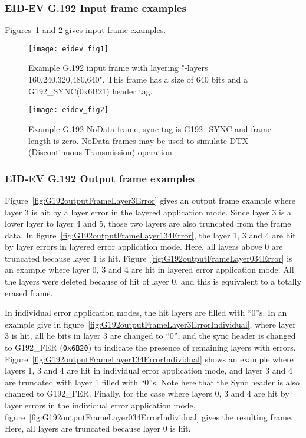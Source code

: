 \subsubsection{EID-EV G.192 Input frame examples }
Figures~\ref{fig:ExampleG192InputFrame} and
\ref{fig:ExampleG192NoDataFrame} gives input frame examples.

\begin{figure}[htp]
  \begin{center}
	\texttt{[image: eidev\_fig1]}
	\caption{Example G.192 input frame with layering  "-layers 160,240,320,480,640".
	This frame has a size of 640 bits and a G192\_SYNC(0x6B21) header tag.}
	\label{fig:ExampleG192InputFrame}
  \end{center}
\end{figure}

\begin{figure}[htp]
  \begin{center}
	\texttt{[image: eidev\_fig2]}
	\caption{Example G.192 NoData frame, sync tag is G192\_SYNC and frame length 
is zero. NoData frames may be used to simulate DTX (Discontinuous Transmission)
operation.}
	\label{fig:ExampleG192NoDataFrame}
  \end{center}
\end{figure}

\newpage
\subsubsection{EID-EV G.192 Output frame examples }
Figure~\ref{fig:G192outputFrameLayer3Error} gives an output frame
example where layer 3 is hit by a layer error in the layered
application mode. Since layer 3 is a lower layer to layer 4 and 5,
those two layers are also truncated from the frame data. In
figure~\ref{fig:G192outputFrameLayer134Error}, the layer 1, 3 and 4
are hit by layer errors in layered error application mode. Here, all
layers above 0 are truncated because layer 1 is
hit. Figure~\ref{fig:G192outputFrameLayer034Error} is an example where
layer 0, 3 and 4 are hit in layered error application mode. All the
layers were deleted because of hit of layer 0, and this is equivalent
to a totally erased frame.

In individual error application modes, the hit layers are filled with
``0''s. In an example give in
figure~\ref{fig:G192outputFrameLayer3ErrorIndividual}, where layer 3
is hit, all he bits in layer 3 are changed to ``0'', and the sync
header is changed to G192\_FER ({\tt 0x6B20}) to indicate the presence
of remaining layers with
errors. Figure~\ref{fig:G192outputFrameLayer134ErrorIndividual} shows
an example where layers 1, 3 and 4 are hit in individual error
application mode, and layer 3 and 4 are truncated with layer 1 filled
with ``0''s. Note here that the Sync header is also changed to
G192\_FER. Finally, for the case where layers 0, 3 and 4 are hit by
layer errors in the individual error application mode, 
figure~\ref{fig:G192outputFrameLayer034ErrorIndividual} gives the
resulting frame. Here, all layers are truncated because layer 0 is
hit.

